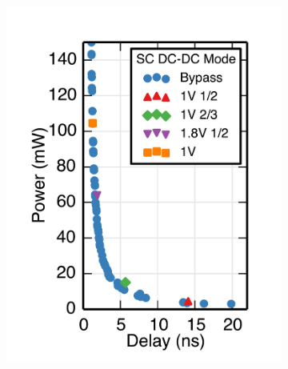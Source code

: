 \documentclass[graybox]{svmult}
\begin{document}
\begin{figure}
\begin{subfigure}[t]{0.23\textwidth}
  \includegraphics[width=\textwidth]{6-raven3-shmoo-c}
  \caption{}
  \label{fig:6-raven3-shmoo-c}
  \end{subfigure}
  \hspace*{\fill}
  \begin{subfigure}[t]{0.23\textwidth}
  \centering

\end{subfigure}
\end{figure}
\end{document}
